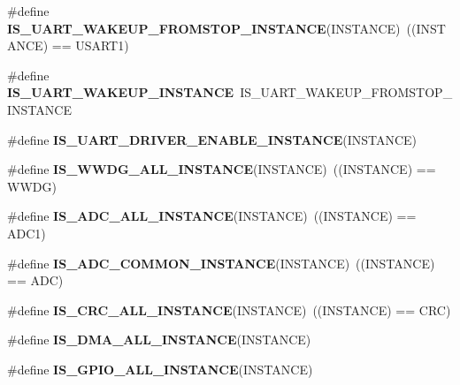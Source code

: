 \begin{DoxyCompactItemize}
\item 
\mbox{\label{group___exported__macro_ga6303097822ab1977cc83f05319a10f1e}} 
\#define {\bfseries I\+S\+\_\+\+U\+A\+R\+T\+\_\+\+W\+A\+K\+E\+U\+P\+\_\+\+F\+R\+O\+M\+S\+T\+O\+P\+\_\+\+I\+N\+S\+T\+A\+N\+CE}(I\+N\+S\+T\+A\+N\+CE)~((I\+N\+S\+T\+A\+N\+CE) == U\+S\+A\+R\+T1)
\item 
\mbox{\label{group___exported__macro_ga69e32d838272d886316fcfa378605ed0}} 
\#define {\bfseries I\+S\+\_\+\+U\+A\+R\+T\+\_\+\+W\+A\+K\+E\+U\+P\+\_\+\+I\+N\+S\+T\+A\+N\+CE}~I\+S\+\_\+\+U\+A\+R\+T\+\_\+\+W\+A\+K\+E\+U\+P\+\_\+\+F\+R\+O\+M\+S\+T\+O\+P\+\_\+\+I\+N\+S\+T\+A\+N\+CE
\item 
\#define {\bfseries I\+S\+\_\+\+U\+A\+R\+T\+\_\+\+D\+R\+I\+V\+E\+R\+\_\+\+E\+N\+A\+B\+L\+E\+\_\+\+I\+N\+S\+T\+A\+N\+CE}(I\+N\+S\+T\+A\+N\+CE)
\item 
\mbox{\label{group___exported__macro_gac2a8aaec233e19987232455643a04d6f}} 
\#define {\bfseries I\+S\+\_\+\+W\+W\+D\+G\+\_\+\+A\+L\+L\+\_\+\+I\+N\+S\+T\+A\+N\+CE}(I\+N\+S\+T\+A\+N\+CE)~((I\+N\+S\+T\+A\+N\+CE) == W\+W\+DG)
\item 
\mbox{\label{group___exported__macro_ga2204b62b378bcf08b3b9006c184c7c23}} 
\#define {\bfseries I\+S\+\_\+\+A\+D\+C\+\_\+\+A\+L\+L\+\_\+\+I\+N\+S\+T\+A\+N\+CE}(I\+N\+S\+T\+A\+N\+CE)~((I\+N\+S\+T\+A\+N\+CE) == A\+D\+C1)
\item 
\mbox{\label{group___exported__macro_gad8a5831c786b6b265531b890a194cbe2}} 
\#define {\bfseries I\+S\+\_\+\+A\+D\+C\+\_\+\+C\+O\+M\+M\+O\+N\+\_\+\+I\+N\+S\+T\+A\+N\+CE}(I\+N\+S\+T\+A\+N\+CE)~((I\+N\+S\+T\+A\+N\+CE) == A\+DC)
\item 
\mbox{\label{group___exported__macro_gaa514941a7f02f65eb27450c05e4e8dd1}} 
\#define {\bfseries I\+S\+\_\+\+C\+R\+C\+\_\+\+A\+L\+L\+\_\+\+I\+N\+S\+T\+A\+N\+CE}(I\+N\+S\+T\+A\+N\+CE)~((I\+N\+S\+T\+A\+N\+CE) == C\+RC)
\item 
\#define {\bfseries I\+S\+\_\+\+D\+M\+A\+\_\+\+A\+L\+L\+\_\+\+I\+N\+S\+T\+A\+N\+CE}(I\+N\+S\+T\+A\+N\+CE)
\item 
\#define {\bfseries I\+S\+\_\+\+G\+P\+I\+O\+\_\+\+A\+L\+L\+\_\+\+I\+N\+S\+T\+A\+N\+CE}(I\+N\+S\+T\+A\+N\+CE)

\end{DoxyCompactItemize}
